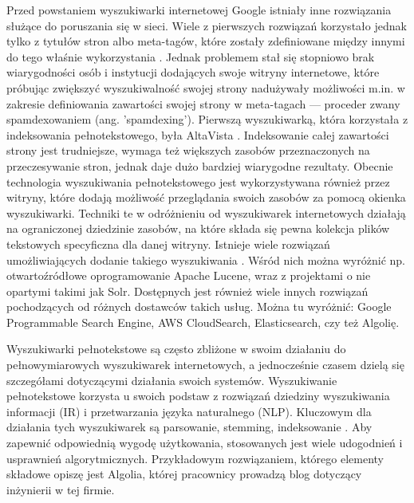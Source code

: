 Przed powstaniem wyszukiwarki internetowej
Google istniały inne rozwiązania służące do poruszania się w sieci. Wiele z pierwszych rozwiązań
korzystało jednak tylko z tytułów stron albo meta-tagów, które zostały zdefiniowane między innymi
do tego właśnie wykorzystania \autocite{bernersleehtml}. Jednak problemem stał się stopniowo brak wiarygodności osób i
instytucji dodających swoje witryny internetowe, które próbując zwiększyć wyszukiwalność swojej
strony nadużywały możliwości m.in. w zakresie definiowania zawartości swojej strony w meta-tagach
— proceder zwany spamdexowaniem (ang. 'spamdexing'). Pierwszą wyszukiwarką, która korzystała
z indeksowania pełnotekstowego, była AltaVista \autocite{altavistahistory}. Indeksowanie całej zawartości strony jest
trudniejsze, wymaga też większych zasobów przeznaczonych na przeczesywanie stron, jednak daje dużo
bardziej wiarygodne rezultaty.
Obecnie technologia wyszukiwania pełnotekstowego jest wykorzystywana również przez
witryny, które dodają możliwość przeglądania swoich zasobów za pomocą okienka wyszukiwarki.
Techniki te w odróżnieniu od wyszukiwarek internetowych działają na ograniczonej dziedzinie
zasobów, na które składa się pewna kolekcja plików tekstowych specyficzna dla danej witryny.
Istnieje wiele rozwiązań umożliwiających dodanie takiego wyszukiwania \autocite{howtoaddfulltextsearch}. Wśród nich można wyróżnić np. otwartoźródłowe oprogramowanie Apache Lucene, wraz z projektami o nie
opartymi takimi jak Solr. Dostępnych jest również wiele innych
rozwiązań pochodzących od różnych dostawców takich usług. Można tu wyróżnić: Google
Programmable Search Engine, AWS CloudSearch, Elasticsearch, czy też Algolię.\newline

Wyszukiwarki pełnotekstowe są często zbliżone w swoim działaniu do pełnowymiarowych
wyszukiwarek internetowych, a jednocześnie czasem dzielą się szczegółami dotyczącymi działania
swoich systemów. Wyszukiwanie pełnotekstowe korzysta u swoich podstaw z
rozwiązań dziedziny wyszukiwania informacji (IR) i przetwarzania języka naturalnego (NLP). Kluczowym dla działania tych wyszukiwarek są parsowanie, stemming,
indeksowanie \autocite{howtoaddfulltextsearch}. Aby zapewnić odpowiednią wygodę użytkowania, stosowanych jest wiele udogodnień i
usprawnień algorytmicznych.
Przykładowym rozwiązaniem, którego elementy składowe opiszę jest Algolia, której
pracownicy prowadzą blog dotyczący inżynierii w tej firmie. \newline 

